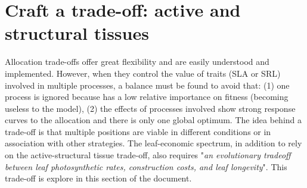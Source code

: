 \section{Craft a trade-off: active and structural tissues}

Allocation trade-offs offer great flexibility and are easily understood and implemented. However, when they control the value of traits (SLA or SRL) involved in multiple processes, a balance must be found to avoid that: (1) one process is ignored because has a low relative importance on fitness (becoming useless to the model), (2) the effects of processes involved show strong response curves to the allocation and there is only one global optimum. The idea behind a trade-off is that multiple positions are viable in different conditions or in association with other strategies. The leaf-economic spectrum, in addition to rely on the active-structural tissue trade-off, also requires "\textit{an evolutionary tradeoff
between leaf photosynthetic rates, construction costs, and leaf longevity}". This trade-off is explore in this section of the document.\\

